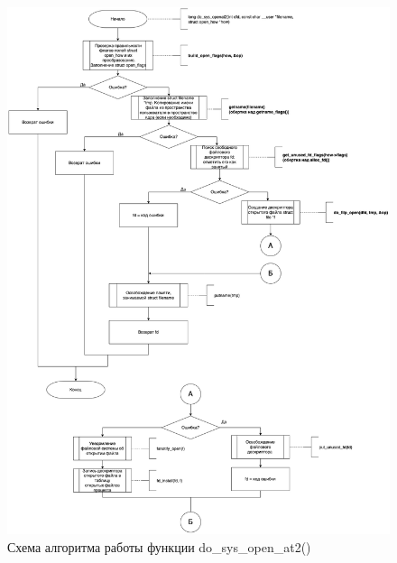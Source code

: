 \begin{figure}[h!]
	\begin{center}
		\includegraphics[width=160mm]{images/do_sys_openat2}
	\end{center}
	\caption{Схема алгоритма работы функции do\_sys\_open\_at2() }
	\label{img:openat2}
\end{figure}

